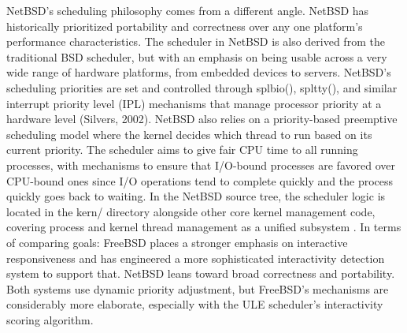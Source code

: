 NetBSD's scheduling philosophy comes from a different angle. NetBSD has historically prioritized portability and correctness over any one platform's performance characteristics. The scheduler in NetBSD is also derived from the traditional BSD scheduler, but with an emphasis on being usable across a very wide range of hardware platforms, from embedded devices to servers. NetBSD's scheduling priorities are set and controlled through splbio(), spltty(), and similar interrupt priority level (IPL) mechanisms that manage processor priority at a hardware level (Silvers, 2002).
NetBSD also relies on a priority-based preemptive scheduling model where the kernel decides which thread to run based on its current priority. The scheduler aims to give fair CPU time to all running processes, with mechanisms to ensure that I/O-bound processes are favored over CPU-bound ones since I/O operations tend to complete quickly and the process quickly goes back to waiting. In the NetBSD source tree, the scheduler logic is located in the kern/ directory alongside other core kernel management code, covering process and kernel thread management as a unified subsystem \parencite{feyrer2002}.
In terms of comparing goals: FreeBSD places a stronger emphasis on interactive responsiveness and has engineered a more sophisticated interactivity detection system to support that. NetBSD leans toward broad correctness and portability. Both systems use dynamic priority adjustment, but FreeBSD's mechanisms are considerably more elaborate, especially with the ULE scheduler's interactivity scoring algorithm.

